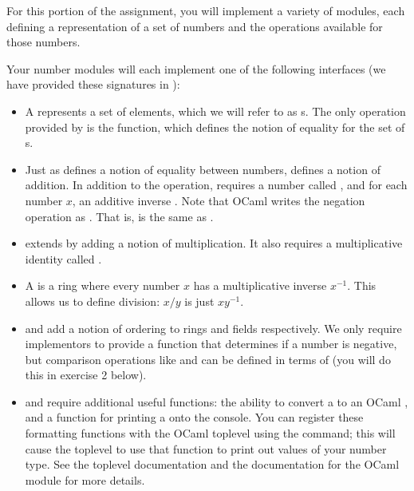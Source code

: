 \documentclass{pset}
\begin{document}
For this portion of the assignment, you will implement a variety of modules,
each defining a representation of a set of numbers and the operations available
for those numbers.

Your number modules will each implement one of the following interfaces (we have
provided these signatures in ):
\begin{itemize}
\item A 
      represents a set of elements, which we will refer to as
      s.  The only operation provided by  is the
      \code{(===)} function, which defines the notion of equality for the set of
      s.

\item Just as  defines a notion of equality
      between numbers, 
      defines a notion of addition.  In addition to the \code{(+)} operation,
       requires a number called , and for each number
      $x$, an additive inverse .  Note that OCaml writes the
      negation operation as \code{(~-)}.  That is,  is the same as
      .

\item {} extends  by adding a notion of
      multiplication.  It also requires a multiplicative identity called
      .

\item A 
      is a ring where every number $x$ has a
      multiplicative inverse $x^{-1}$.  This allows us to define
      division: $x/y$ is just $xy^{-1}$.
      
\item {} and
      add a notion of ordering to
      rings and fields respectively.  We only require implementors to provide
      a function that determines if a number is negative, but
      comparison operations like \code{(<)} and \code{(>)} can
      be defined in terms of  (you will do this in exercise 2
      below).

\item {} and  require additional useful functions:
      the ability to convert a  to an OCaml , and a
      function for printing a  onto the console.  You can register
      these formatting functions with the OCaml toplevel using the
       command; this will cause the toplevel to use that
      function to print out values of your number type.  See the
      toplevel documentation and the documentation for the OCaml 
      module for more details.
\end{itemize}
\end{document}
